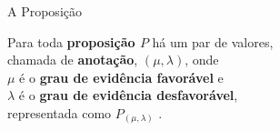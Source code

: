 \begin{frame}{A Proposição}
\vspace{1cm}

\begin{block}{}
\center
Para toda \textbf{proposição $P$} há um par de valores, \\
chamada de \textbf{anotação}, \textbf{$(\mu , \lambda )$}, onde \\
$\mu$ é o \textbf{grau de evidência favorável} e \\
$\lambda $ é o \textbf{grau de evidência desfavorável}, \\
representada como  \textbf{$P_{( \mu , \lambda )}$ }.
\end{block}

\end{frame}





